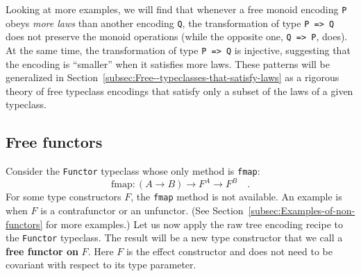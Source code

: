 Looking at more examples, we will find that whenever a free monoid
encoding \lstinline!P!
obeys \emph{more laws} than another encoding \lstinline!Q!,
the transformation of type \lstinline!P => Q!
does not preserve the monoid operations (while the opposite one, \lstinline!Q => P!,
does). At the same time, the transformation of type \lstinline!P => Q!
is injective, suggesting that the encoding is \textsf{``}smaller\textsf{''} when it
satisfies more laws. These patterns will be generalized in Section~\ref{subsec:Free--typeclasses-that-satisfy-laws}
as a rigorous theory of free typeclass encodings that satisfy only
a subset of the laws of a given typeclass.

\subsection{Free functors}

Consider the \lstinline!Functor!
typeclass whose only method is \lstinline!fmap!:
\[
\text{fmap}:\left(A\rightarrow B\right)\rightarrow F^{A}\rightarrow F^{B}\quad.
\]
For some type constructors $F$, the \lstinline!fmap!
method is not available. An example is when $F$ is a contrafunctor
or an unfunctor. (See Section~\ref{subsec:Examples-of-non-functors}
for more examples.) Let us now apply the raw tree encoding recipe
to the \lstinline!Functor!
typeclass. The result will be a new type constructor that we call
a \textbf{free functor on} $F$. Here $F$ is
the effect constructor and does not need to be covariant with respect
to its type parameter.

